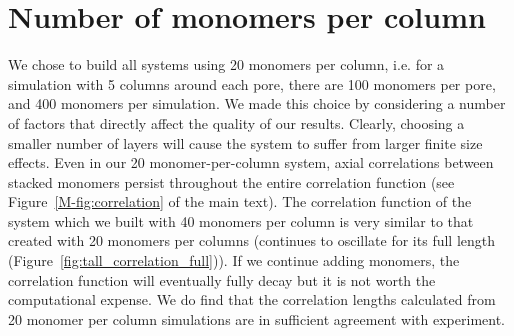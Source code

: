 \documentclass{article}
\begin{document}
  \section{Number of monomers per column}\label{section:monomers_per_column}
  
  We chose to build all systems using 20 monomers per column, i.e. for a simulation with 5 columns around each pore, there are 100 monomers per pore, and 400 monomers per simulation.  We made this choice
  by considering a number of factors that directly affect the quality of our results. 
  Clearly, choosing a smaller number of layers will cause the system to suffer from 
  larger finite size effects. Even in our 20 monomer-per-column system, axial correlations
  between stacked monomers persist throughout the entire correlation function (see
  Figure~\ref{M-fig:correlation} of the main text). The correlation function of the system which we
  built with 40 monomers per column is very similar to that created with 20 monomers
  per columns (continues to oscillate for its full length
  (Figure~\ref{fig:tall_correlation_full})). If we continue adding monomers, the 
  correlation function will eventually fully decay but it is not worth the 
  computational expense. We do find that the correlation lengths calculated from 20
  monomer per column simulations are in sufficient agreement with experiment. 
\end{document}
